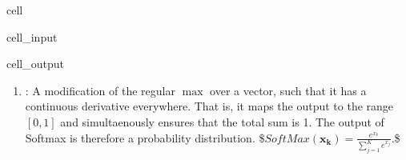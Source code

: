 \documentclass[letterpaper,10pt,english]{jupyterBook}
\begin{document}
\begin{sphinxuseclass}{cell}\begin{sphinxVerbatimInput}

\begin{sphinxuseclass}{cell_input}
\begin{sphinxVerbatim}[commandchars=\\\{\}]
   
   

  
 
\end{sphinxVerbatim}

\end{sphinxuseclass}\end{sphinxVerbatimInput}
\begin{sphinxVerbatimOutput}

\begin{sphinxuseclass}{cell_output}
\noindent{}

\end{sphinxuseclass}\end{sphinxVerbatimOutput}

\end{sphinxuseclass}\begin{enumerate}
%
\item {} 
\sphinxAtStartPar
{}: A modification
of the regular \(\max\) over a vector, such that it has a continuous derivative
everywhere. That is, it maps the
output to the range \([0,1]\) and simultaenously ensures
that the total sum is 1. The output of Softmax is therefore
a probability distribution.
\$\(  SoftMax (\mathbf {x_k} )=\frac {e^{x_k}}{\sum _{j=1}^{K}e^{x_j}}.\)\$

\end{enumerate}
\end{document}
